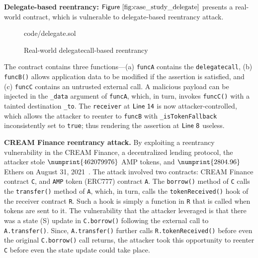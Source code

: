 \documentclass[conference, romanappendices]{tex/IEEEtran}
\theoremstyle{bfnote}
\newcommand{\reentrancy}{{reentrancy}\xspace}
\let\num\numprint
\newcommand{\Line}[1]{\ensuremath{\sf Line~ #1}}
\newcommand{\Fig}[1]{\ensuremath{\sf Figure~\ref{#1}}}
\begin{document}
\noindent
\textbf{Delegate-based \reentrancy:} \Fig{fig:case_study_delegate} presents a real-world contract, which is vulnerable to delegate-based \reentrancy attack.

\begin{figure}[h]
	\vspace{-4mm}
	
	{code/delegate.sol}
	\vspace{-6mm}
	\caption{Real-world delegatecall-based \reentrancy}
	\label{fig:case_study_delegate}
	\vspace{-3mm}
\end{figure}
The contract contains three functions---(a) \texttt{funcA} contains the \texttt{delegatecall},
(b) \texttt{funcB()} allows application data to be modified if the assertion is satisfied, and (c) \texttt{funcC} contains an untrusted external call.
A malicious payload can be injected in the \texttt{\_data} argument of \texttt{funcA}, which, in turn, invokes \texttt{funcC()} with a tainted destination \texttt{\_to}.
The \texttt{receiver} at \Line{14} is now attacker-controlled, which allows the attacker to reenter to \texttt{funcB} with \texttt{\_isTokenFallback} inconsistently set to \texttt{true}; thus rendering the assertion at \Line{8} useless.

\noindent
\textbf{CREAM Finance \reentrancy attack.}
By exploiting a \reentrancy vulnerability in the CREAM {Finance\EndAccSupp{}}, a {decentralized\EndAccSupp{}} {lending\EndAccSupp{}} protocol, the attacker stole $\num{462079976}$ AMP tokens, and $\num{2804.96}$ {Ethers\EndAccSupp{}} on August 31, 2021~\cite{cream}.
The attack involved two contracts: CREAM {Finance\EndAccSupp{}} contract \texttt{C}, and \texttt{AMP} token (ERC777) contract \texttt{A}.
The \texttt{borrow()} method of \texttt{C} calls the \texttt{transfer()} method of \texttt{A}, which, in turn, calls the \texttt{tokenReceived()} hook of the receiver contract \texttt{R}.
Such a hook is simply a function in \texttt{R} that is called when tokens are sent to it.
The vulnerability that the attacker leveraged is that there was a state (S) update in \texttt{C.borrow()} following the external call to \texttt{A.transfer()}.
Since, \texttt{A.transfer()} further calls \texttt{R.tokenReceived()} before even the original \texttt{C.borrow()} call returns, the attacker took this opportunity to reenter \texttt{C} before even the state update could take place.
\end{document}

